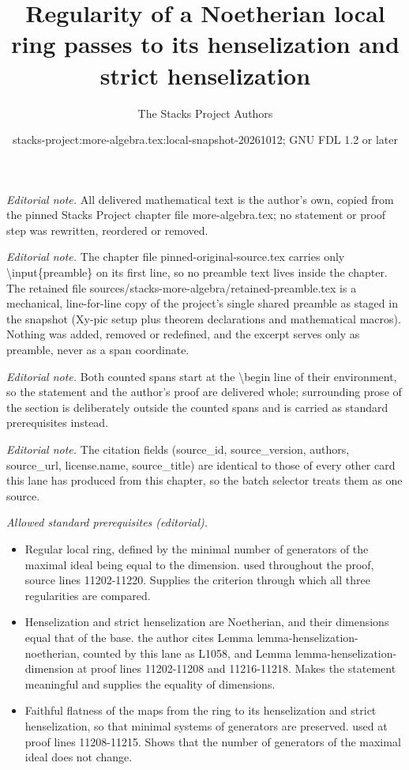 \documentclass[10pt,a4paper]{amsart}
\title{Regularity of a Noetherian local ring passes to its henselization and strict henselization}
\author{The Stacks Project Authors}
\date{stacks-project:more-algebra.tex:local-snapshot-20261012; GNU FDL 1.2 or later}
\theoremstyle{plain}
\theoremstyle{definition}
\theoremstyle{remark}
\numberwithin{equation}{subsection}
\begin{document}
\maketitle
\setcounter{subsection}{1}
\noindent\textit{Editorial note.} All delivered mathematical text is the author's own, copied from the pinned Stacks Project chapter file more-algebra.tex; no statement or proof step was rewritten, reordered or removed.\par\medskip
\noindent\textit{Editorial note.} The chapter file pinned-original-source.tex carries only \textbackslash{}input\{preamble\} on its first line, so no preamble text lives inside the chapter. The retained file sources/stacks-more-algebra/retained-preamble.tex is a mechanical, line-for-line copy of the project's single shared preamble as staged in the snapshot (Xy-pic setup plus theorem declarations and mathematical macros). Nothing was added, removed or redefined, and the excerpt serves only as preamble, never as a span coordinate.\par\medskip
\noindent\textit{Editorial note.} Both counted spans start at the \textbackslash{}begin line of their environment, so the statement and the author's proof are delivered whole; surrounding prose of the section is deliberately outside the counted spans and is carried as standard prerequisites instead.\par\medskip
\noindent\textit{Editorial note.} The citation fields (source\_id, source\_version, authors, source\_url, license.name, source\_title) are identical to those of every other card this lane has produced from this chapter, so the batch selector treats them as one source.\par\medskip
\noindent\textit{Allowed standard prerequisites (editorial).}\begin{itemize}
\item Regular local ring, defined by the minimal number of generators of the maximal ideal being equal to the dimension. used throughout the proof, source lines 11202-11220. Supplies the criterion through which all three regularities are compared.
\item Henselization and strict henselization are Noetherian, and their dimensions equal that of the base. the author cites Lemma lemma-henselization-noetherian, counted by this lane as L1058, and Lemma lemma-henselization-dimension at proof lines 11202-11208 and 11216-11218. Makes the statement meaningful and supplies the equality of dimensions.
\item Faithful flatness of the maps from the ring to its henselization and strict henselization, so that minimal systems of generators are preserved. used at proof lines 11208-11215. Shows that the number of generators of the maximal ideal does not change.
\end{itemize}\medskip
\end{document}
